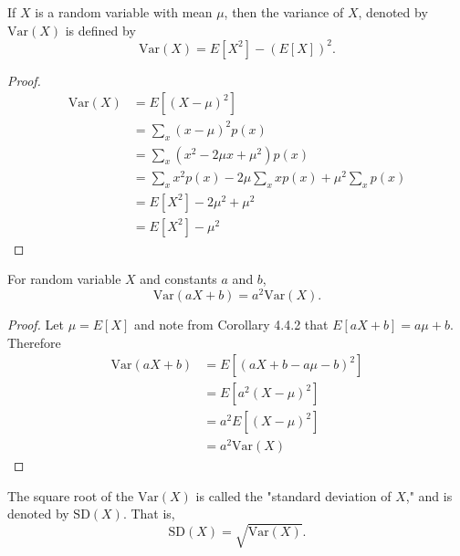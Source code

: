 \documentclass[a4paper,11pt]{article}
\begin{document}
\begin{outline}
    If \(X\) is a random variable with mean \(\mu\), then the variance of \(X\), denoted by \(\text{Var}(X)\) 
    is defined by \[\text{Var}(X) = E[X^2]-(E[X])^2\text{.} \]
    
    \pagebreak
    \begin{proof}
      \begin{align*}
        \text{Var}(X) &= E[(X-\mu)^2] \\
                      &= \sum_x(x-\mu)^2p(x) \\
                      &= \sum_x(x^2-2\mu x+\mu^2)p(x) \\
                      &= \sum_x x^2p(x) - 2\mu\sum_x xp(x) + \mu^2\sum_x p(x) \\
                      &= E[X^2] - 2\mu^2 + \mu^2 \\
                      &= E[X^2] - \mu^2
      \end{align*}
    \end{proof}
    
    For random variable \(X\) and constants \(a\) and \(b\),
    \[ \text{Var}(aX+b) = a^2\text{Var}(X)\text{.} \]
    
    \begin{proof}
      Let \(\mu = E[X]\) and note from Corollary 4.4.2 that \(E[aX+b] = a\mu+b\).
      Therefore
      \begin{align*}
        \text{Var}(aX+b) &= E[(aX+b-a\mu-b)^2] \\
                         &= E[a^2(X-\mu)^2] \\
                         &= a^2E[(X-\mu)^2] \\
                         &= a^2\text{Var}(X)
      \end{align*}
    \end{proof}
    
    The square root of the \(\text{Var}(X)\) is called the "standard deviation of \(X\)," and is denoted by 
    \(\text{SD}(X)\). That is, \[\text{SD}(X) = \sqrt{\text{Var}(X)}\text{.}\]
    
\end{outline}
\end{document}
